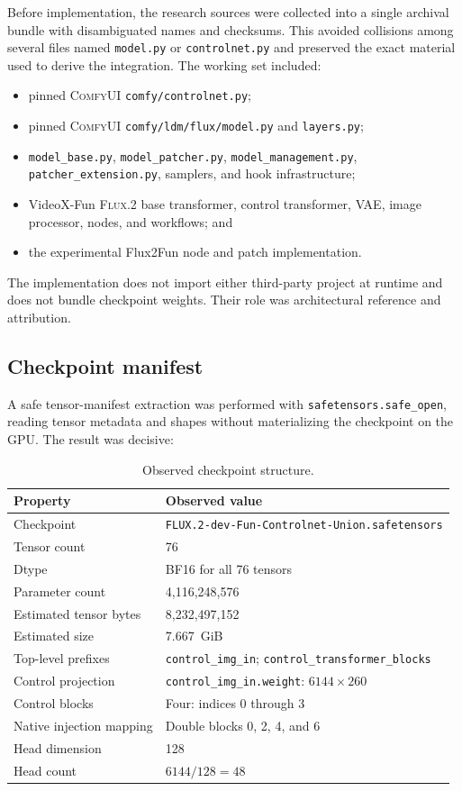 \documentclass[11pt]{article}
\newcommand{\FluxTwo}{\textsc{Flux.2}}
\newcommand{\ComfyUI}{\textsc{ComfyUI}}
\newcommand{\code}[1]{\texttt{#1}}
\begin{document}
Before implementation, the research sources were collected into a single archival bundle with disambiguated names and checksums. This avoided collisions among several files named \code{model.py} or \code{controlnet.py} and preserved the exact material used to derive the integration. The working set included:

\begin{itemize}
  \item pinned \ComfyUI{} \code{comfy/controlnet.py};
  \item pinned \ComfyUI{} \code{comfy/ldm/flux/model.py} and \code{layers.py};
  \item \code{model\_base.py}, \code{model\_patcher.py}, \code{model\_management.py}, \code{patcher\_extension.py}, samplers, and hook infrastructure;
  \item VideoX-Fun \FluxTwo{} base transformer, control transformer, VAE, image processor, nodes, and workflows; and
  \item the experimental Flux2Fun node and patch implementation.
\end{itemize}

The implementation does not import either third-party project at runtime and does not bundle checkpoint weights. Their role was architectural reference and attribution.

\subsection{Checkpoint manifest}

A safe tensor-manifest extraction was performed with \code{safetensors.safe\_open}, reading tensor metadata and shapes without materializing the checkpoint on the GPU. The result was decisive:

\begin{table}[H]
\centering
\caption{Observed checkpoint structure.}
\begin{tabularx}{\textwidth}{@{}lX@{}}
\toprule
Property & Observed value \\
\midrule
Checkpoint & \code{FLUX.2-dev-Fun-Controlnet-Union.safetensors} \\
Tensor count & 76 \\
Dtype & BF16 for all 76 tensors \\
Parameter count & 4,116,248,576 \\
Estimated tensor bytes & 8,232,497,152 \\
Estimated size & 7.667~GiB \\
Top-level prefixes & \code{control\_img\_in}; \code{control\_transformer\_blocks} \\
Control projection & \code{control\_img\_in.weight}: $6144\times260$ \\
Control blocks & Four: indices 0 through 3 \\
Native injection mapping & Double blocks 0, 2, 4, and 6 \\
Head dimension & 128 \\
Head count & $6144/128=48$ \\
\bottomrule
\end{tabularx}
\end{table}
\end{document}
